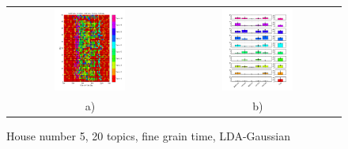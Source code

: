 \begin{figure}
 \centering
 \begin{tabular}{c c}
  \includegraphics[width=0.45\textwidth]{Pictures/Gaus/fine/DayHN5TS48k20fine.png}
  &
  \includegraphics[width=0.45\textwidth]{Pictures/Gaus/fine/TopHN5TS48k20fine.png}\\
  a) & b)
 \end{tabular}
  \caption{House number 5, 20 topics, fine grain time, LDA-Gaussian}
  \label{fig:HN5Gaus20fine}
\end{figure}


